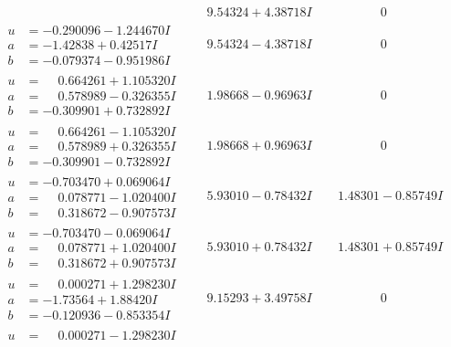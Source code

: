 \documentclass[1p]{elsarticle_modified}
\theoremstyle{definition}
\begin{document}
$$\begin{array}{c|c|c}
 & \phantom{-}9.54324 + 4.38718 I & \phantom{-0.000000 } 0 \\ \hline\begin{aligned}
u &= -0.290096 - 1.244670 I \\
a &= -1.42838 + 0.42517 I \\
b &= -0.079374 - 0.951986 I\end{aligned}
 & \phantom{-}9.54324 - 4.38718 I & \phantom{-0.000000 } 0 \\ \hline\begin{aligned}
u &= \phantom{-}0.664261 + 1.105320 I \\
a &= \phantom{-}0.578989 - 0.326355 I \\
b &= -0.309901 + 0.732892 I\end{aligned}
 & \phantom{-}1.98668 - 0.96963 I & \phantom{-0.000000 } 0 \\ \hline\begin{aligned}
u &= \phantom{-}0.664261 - 1.105320 I \\
a &= \phantom{-}0.578989 + 0.326355 I \\
b &= -0.309901 - 0.732892 I\end{aligned}
 & \phantom{-}1.98668 + 0.96963 I & \phantom{-0.000000 } 0 \\ \hline\begin{aligned}
u &= -0.703470 + 0.069064 I \\
a &= \phantom{-}0.078771 - 1.020400 I \\
b &= \phantom{-}0.318672 - 0.907573 I\end{aligned}
 & \phantom{-}5.93010 - 0.78432 I & \phantom{-}1.48301 - 0.85749 I \\ \hline\begin{aligned}
u &= -0.703470 - 0.069064 I \\
a &= \phantom{-}0.078771 + 1.020400 I \\
b &= \phantom{-}0.318672 + 0.907573 I\end{aligned}
 & \phantom{-}5.93010 + 0.78432 I & \phantom{-}1.48301 + 0.85749 I \\ \hline\begin{aligned}
u &= \phantom{-}0.000271 + 1.298230 I \\
a &= -1.73564 + 1.88420 I \\
b &= -0.120936 - 0.853354 I\end{aligned}
 & \phantom{-}9.15293 + 3.49758 I & \phantom{-0.000000 } 0 \\ \hline\begin{aligned}
u &= \phantom{-}0.000271 - 1.298230 I \\

\end{aligned}
\end{array}$$
\end{document}
